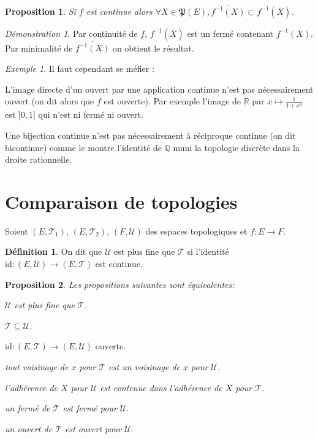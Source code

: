 \documentclass[a4paper, 11pt, french]{book}
\newenvironment{itemise}{\itemize}{\enditemize}
\theoremstyle{plain} %
\newtheorem{proposition}{Proposition}
\theoremstyle{definition} %
\newtheorem{definition}{Définition}
\theoremstyle{remark} %
\newtheorem{exemple}{Exemple}
\newtheorem*{demonstration}{Démonstration}
\newcommand{\1}{\mathds{1}}
\newcommand{\id}{\mathrm{id}}
\newcommand{\inv}[1]{#1^{-1}}
\newcommand{\Q}{\mathbb{Q}}
\newcommand{\R}{\mathbb{R}}
\renewcommand{\frak}[1]{\mathfrak{#1}}
\newcommand{\scr}[1]{\mathscr{#1}}
\begin{document}
\begin{proposition}
	Si $f$ est continue alors $\forall X\in\frak{P}(E), \overline{\inv{f}(X)}\subset\inv{f}(\overline{X})$.
\end{proposition}

\begin{demonstration}
	Par continuité de $f$, $\inv{f}(\overline{X})$ est un fermé contenant $\inv{f}(X)$.
	Par minimalité de $\overline{\inv{f}(X)}$ on obtient le résultat.
\end{demonstration}

\begin{exemple}
	Il faut cependant se méfier :
	\begin{itemise}
		\item L'image directe d'un ouvert par une application continue n'est pas nécessairement ouvert (on dit alors que $f$ est ouverte).
		Par exemple l'image de $\R$ par $x\mapsto\frac{1}{1+x^2}$ est $]0,1]$ qui n'est ni fermé ni ouvert.
		\item Une bijection continue n'est pas nécessairement à réciproque continue (on dit bicontinue) comme le montre l'identité de $\Q$ muni la topologie discrète dans la droite rationnelle.
	\end{itemise}
\end{exemple}

\section{Comparaison de topologies}

Soient $(E, \scr{T}_1)$, $(E, \scr{T}_2)$, $(F, \scr{U})$ des espaces topologiques et $f\colon E\rightarrow F$.

\begin{definition}
	On dit que $\scr{U}$ est plus fine que $\scr{T}$ si l'identité $\id\colon(E, \scr{U})\rightarrow(E, \scr{T})$ est continue.
\end{definition}

\begin{proposition}
	Les propositions suivantes sont équivalentes:
	\begin{itemise}
		\item $\scr{U}$ est plus fine que $\scr{T}$.
		\item $\scr{T}\subseteq\scr{U}$.
		\item $\id\colon(E, \scr{T})\rightarrow(E, \scr{U})\text{ ouverte}$.
		\item tout voisinage de $x$ pour $\scr{T}$ est un voisinage de $x$ pour $\scr{U}$.
		\item l'adhérence de $X$ pour $\scr{U}$ est contenue dans l'adhérence de $X$ pour $\scr{T}$.
		\item un fermé de $\scr{T}$ est fermé pour $\scr{U}$.
		\item un ouvert de $\scr{T}$ est ouvert pour $\scr{U}$.
	\end{itemise}
\end{proposition}
\end{document}
